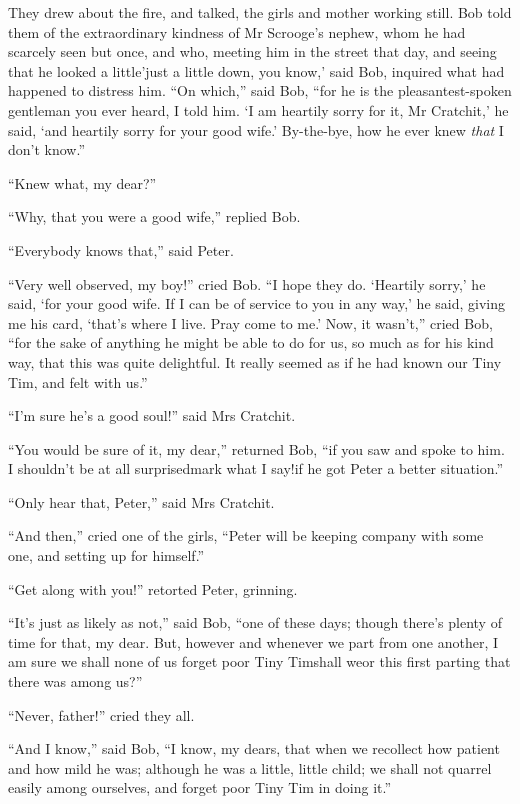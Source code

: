 \documentclass[paper=5.5in:8.5in,BCOR=10mm,twoside,DIV=15,12pt,usegeometry,openany]{scrbook} %
\begin{document}
They drew about the fire, and talked, the girls and mother working still. Bob told them of the extraordinary kindness of Mr Scrooge's nephew, whom he had scarcely seen but once, and who, meeting him in the street that day, and seeing that he looked a little\textemdash 'just a little down, you know,' said Bob, inquired what had happened to distress him. \enquote{On which,} said Bob, \enquote{for he is the pleasantest-spoken gentleman you ever heard, I told him. \enquote{I am heartily sorry for it, Mr Cratchit,} he said, \enquote{and heartily sorry for your good wife.} By-the-bye, how he ever knew \textit{that} I don't know.}

\enquote{Knew what, my dear?}

\enquote{Why, that you were a good wife,} replied Bob.

\enquote{Everybody knows that,} said Peter.

\enquote{Very well observed, my boy!} cried Bob. \enquote{I hope they do. \enquote{Heartily sorry,} he said, \enquote{for your good wife. If I can be of service to you in any way,} he said, giving me his card, \enquote{that's where I live. Pray come to me.} Now, it wasn't,} cried Bob, \enquote{for the sake of anything he might be able to do for us, so much as for his kind way, that this was quite delightful. It really seemed as if he had known our Tiny Tim, and felt with us.}

\enquote{I'm sure he's a good soul!} said Mrs Cratchit.

\enquote{You would be sure of it, my dear,} returned Bob, \enquote{if you saw and spoke to him. I shouldn't be at all surprised\textemdash mark what I say!\textemdash if he got Peter a better situation.}

\enquote{Only hear that, Peter,} said Mrs Cratchit.

\enquote{And then,} cried one of the girls, \enquote{Peter will be keeping company with some one, and setting up for himself.}

\enquote{Get along with you!} retorted Peter, grinning.

\enquote{It's just as likely as not,} said Bob, \enquote{one of these days; though there's plenty of time for that, my dear. But, however and whenever we part from one another, I am sure we shall none of us forget poor Tiny Tim\textemdash shall we\textemdash or this first parting that there was among us?}

\enquote{Never, father!} cried they all.

\enquote{And I know,} said Bob, \enquote{I know, my dears, that when we recollect how patient and how mild he was; although he was a little, little child; we shall not quarrel easily among ourselves, and forget poor Tiny Tim in doing it.}
\end{document}
